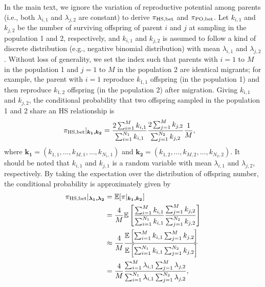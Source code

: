 \documentclass[12pt, English]{article}
\begin{document}
\begin{spacing}{1.9}
In the main text, we ignore the variation of reproductive potential among parents (i.e., both $\lambda_{i,1}$ and $\lambda_{j,2}$ are constant) to derive $\pi_{\rm HS,bet}$ and $\pi_{\rm PO,bet}$. Let $k_{i,1}$ and $k_{j,2}$ be the number of surviving offspring of parent $i$ and $j$ at sampling in the population 1 and 2, respectively, and $k_{i,1}$ and $k_{j,2}$ is assumed to follow a kind of discrete distribution (e.g., negative binomial distribution) with mean $\lambda_{i,1}$ and $\lambda_{j,2}$. Without loss of generality, we set the index such that parents with $i=1$ to $M$ in the population 1 and $j=1$ to $M$ in the population 2 are identical migrants; for example, the parent with $i=1$ reproduce $k_{1,1}$ offspring (in the population 1) and then reproduce $k_{1,2}$ offspring (in the population 2) after migration. Giving $k_{i,1}$ and $k_{j,2}$, the conditional probability that two offspring sampled in the population 1 and 2 share an HS relationship is
\begin{align}
\pi_{\rm HS,bet} | _{\boldsymbol{k_1, k_2}} &= \frac{ 2\sum_{i=1}^M k_{i,1} } { \sum_{i=1}^{N_1} k_{i,1} } \frac{ 2\sum_{j=1}^M k_{j,2} } { \sum_{j=1}^{N_2} k_{j,2} } \frac{1}{M}, 
\end{align}
where $\boldsymbol{k_1}=(k_{1,1}, \ldots, k_{M,1}, \ldots, k_{N_1,1})$ and $\boldsymbol{k_2}=(k_{1,2}, \ldots, k_{M,2}, \ldots, k_{N_2,2})$. It should be noted that $k_{i,1}$ and $k_{j,1}$ is a random variable with mean $\lambda_{i,1}$ and $\lambda_{j,2}$, respectively. By taking the expectation over the distribution of offspring number, the conditional probability is approximately given by
\begin{align}
\pi_{\rm HS,bet} | _{\boldsymbol{\lambda_1, \lambda_2}} &= \mathbb{E}[\pi | _{\boldsymbol{k_1, k_2}}] \nonumber\\
&= \frac{4}{M} \mathbb{E}\left[\frac{ \sum_{i=1}^M k_{i,1} } { \sum_{i=1}^{N_1} k_{i,1} } \frac{ \sum_{j=1}^M k_{j,2} } { \sum_{j=1}^{N_2} k_{j,2} } \right]   \nonumber\\
&\approx \frac{4}{M} \frac{ \mathbb{E}\left[ \sum_{i=1}^M k_{i,1} \sum_{j=1}^M k_{j,2} \right] } {\mathbb{E}\left[ \sum_{i=1}^{N_1} k_{i,1} \sum_{j=1}^{N_2} k_{j,2}\right]} \nonumber\\
&= \frac{4}{M} \frac{ \sum_{i=1}^M \lambda_{i,1} \sum_{j=1}^M \lambda_{j,2} } {\sum_{i=1}^{N_1} \lambda_{i,1} \sum_{j=1}^{N_2} \lambda_{j,2}},
\end{align}

\end{spacing}
\end{document}
